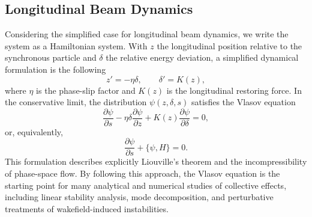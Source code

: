 \subsection{Longitudinal Beam Dynamics}
Considering the simplified case for longitudinal beam dynamics, we write the system as a Hamiltonian system. With $z$ the longitudinal position relative to the synchronous particle and $\delta$ the relative energy deviation, a simplified dynamical formulation is the following
\begin{equation}
    z'=-\eta\delta,\qquad \delta'=K(z),
    \label{eq:longitudinal_hamiltonian_equations}
\end{equation}
where $\eta$ is the phase-slip factor and $K(z)$ is the longitudinal restoring force. In the conservative limit, the distribution $\psi(z,\delta,s)$ satisfies the Vlasov equation
\begin{equation}
    \frac{\partial \psi}{\partial s}-\eta\delta\frac{\partial \psi}{\partial z}+K(z)\frac{\partial \psi}{\partial \delta}=0,
    \label{eq:vlasov_revised}
\end{equation}
or, equivalently,
\begin{equation}
    \frac{\partial \psi}{\partial s}+\{\psi,H\}=0.
    \label{eq:vlasov_hamiltonian_revised}
\end{equation}
This formulation describes explicitly Liouville's theorem and the incompressibility of phase-space flow. By following this approach, the Vlasov equation is the starting point for many analytical and numerical studies of collective effects, including linear stability analysis, mode decomposition, and perturbative treatments of wakefield-induced instabilities.

